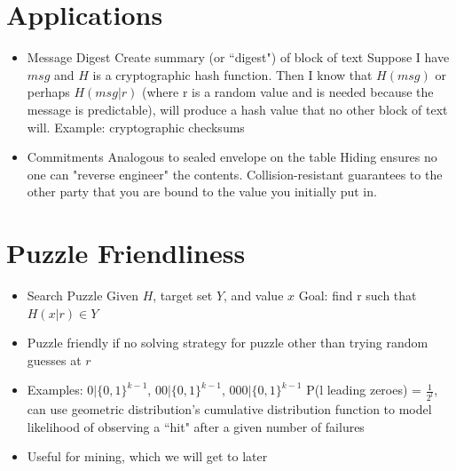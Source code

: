 \documentclass{article}
\begin{document}
\section*{Applications}
\begin{itemize}
  \item Message Digest
    \subitem Create summary (or ``digest") of block of text
    \subitem Suppose I have $msg$ and $H$ is a cryptographic hash function. Then I know that $H(msg)$ or perhaps $H(msg|r)$ (where r is a random value and is needed because the message is predictable), will produce a hash value that no other block of text will.
    \subitem Example: cryptographic checksums
  \item Commitments
    \subitem Analogous to sealed envelope on the table
    \subitem Hiding ensures no one can "reverse engineer" the contents. Collision-resistant guarantees to the other party that you are bound to the value you initially put in.
\end{itemize}

\section*{Puzzle Friendliness}
\begin{itemize}
  \item Search Puzzle
    \subitem Given $H$, target set $Y$, and value $x$
    \subitem Goal: find r such that $H(x|r) \in Y$
  \item Puzzle friendly if no solving strategy for puzzle other than trying random guesses at $r$
  \item Examples: $0|\{0,1\}^{k-1}$, $00|\{0,1\}^{k-1}$, $000|\{0,1\}^{k-1}$
    \subitem P(l leading zeroes) = $\frac{1}{2^l}$, can use geometric distribution's cumulative distribution function to model likelihood of observing a ``hit" after a given number of failures
  \item Useful for mining, which we will get to later
\end{itemize}
\end{document}
